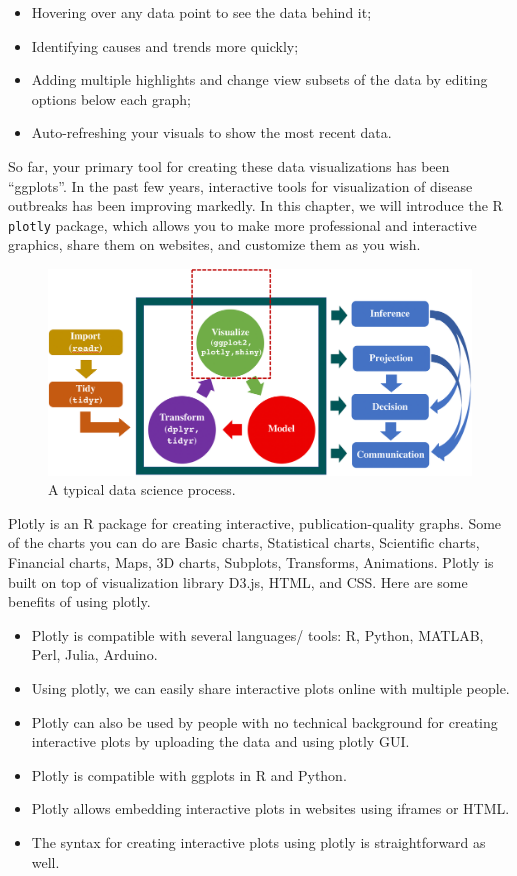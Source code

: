 \documentclass[]{book}
\providecommand{\tightlist}{%
  \setlength{\itemsep}{0pt}\setlength{\parskip}{0pt}}
\begin{document}
\begin{itemize}
\tightlist
\item
  Hovering over any data point to see the data behind it;
\item
  Identifying causes and trends more quickly;
\item
  Adding multiple highlights and change view subsets of the data by
  editing options below each graph;
\item
  Auto-refreshing your visuals to show the most recent data.
\end{itemize}

So far, your primary tool for creating these data visualizations has
been ``ggplots''. In the past few years, interactive tools for
visualization of disease outbreaks has been improving markedly. In this
chapter, we will introduce the R \texttt{plotly} package, which allows
you to make more professional and interactive graphics, share them on
websites, and customize them as you wish.

\begin{figure}

{\centering \includegraphics[width=0.8\linewidth]{figures/process3} 

}

\caption{A typical data science process.}\label{fig:process3}
\end{figure}

Plotly is an R package for creating interactive, publication-quality
graphs. Some of the charts you can do are Basic charts, Statistical
charts, Scientific charts, Financial charts, Maps, 3D charts, Subplots,
Transforms, Animations. Plotly is built on top of visualization library
D3.js, HTML, and CSS. Here are some benefits of using plotly.

\begin{itemize}
\tightlist
\item
  Plotly is compatible with several languages/ tools: R, Python, MATLAB,
  Perl, Julia, Arduino.
\item
  Using plotly, we can easily share interactive plots online with
  multiple people.
\item
  Plotly can also be used by people with no technical background for
  creating interactive plots by uploading the data and using plotly GUI.
\item
  Plotly is compatible with ggplots in R and Python.
\item
  Plotly allows embedding interactive plots in websites using iframes or
  HTML.
\item
  The syntax for creating interactive plots using plotly is
  straightforward as well.
\end{itemize}
\end{document}
